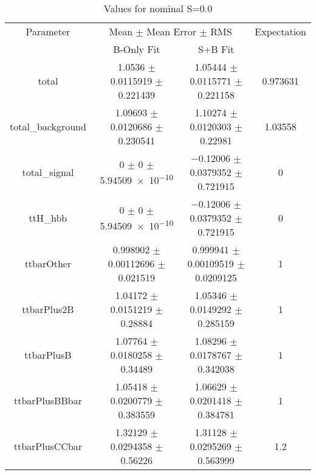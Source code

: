 \begin{table}
\centering
\caption{Values for nominal S=0.0}
\begin{tabular}{cccc}
\toprule
Parameter & \multicolumn{2}{c}{Mean $\pm$ Mean Error $\pm$ RMS} & Expectation\\
 & B-Only Fit & S+B Fit & \\
\midrule
total & \num{1.0536} $\pm$ \num{0.0115919} $\pm$ \num{0.221439} & \num{1.05444} $\pm$ \num{0.0115771} $\pm$ \num{0.221158} & \num{0.973631}\\
total\_background & \num{1.09693} $\pm$ \num{0.0120686} $\pm$ \num{0.230541} & \num{1.10274} $\pm$ \num{0.0120303} $\pm$ \num{0.22981} & \num{1.03558}\\
total\_signal & \num{0} $\pm$ \num{0} $\pm$ \num{5.94509e-10} & \num{-0.12006} $\pm$ \num{0.0379352} $\pm$ \num{0.721915} & \num{0}\\
ttH\_hbb & \num{0} $\pm$ \num{0} $\pm$ \num{5.94509e-10} & \num{-0.12006} $\pm$ \num{0.0379352} $\pm$ \num{0.721915} & \num{0}\\
ttbarOther & \num{0.998902} $\pm$ \num{0.00112696} $\pm$ \num{0.021519} & \num{0.999941} $\pm$ \num{0.00109519} $\pm$ \num{0.0209125} & \num{1}\\
ttbarPlus2B & \num{1.04172} $\pm$ \num{0.0151219} $\pm$ \num{0.28884} & \num{1.05346} $\pm$ \num{0.0149292} $\pm$ \num{0.285159} & \num{1}\\
ttbarPlusB & \num{1.07764} $\pm$ \num{0.0180258} $\pm$ \num{0.34489} & \num{1.08296} $\pm$ \num{0.0178767} $\pm$ \num{0.342038} & \num{1}\\
ttbarPlusBBbar & \num{1.05418} $\pm$ \num{0.0200779} $\pm$ \num{0.383559} & \num{1.06629} $\pm$ \num{0.0201418} $\pm$ \num{0.384781} & \num{1}\\
ttbarPlusCCbar & \num{1.32129} $\pm$ \num{0.0294358} $\pm$ \num{0.56226} & \num{1.31128} $\pm$ \num{0.0295269} $\pm$ \num{0.563999} & \num{1.2}\\
\bottomrule
\end{tabular}
\end{table}